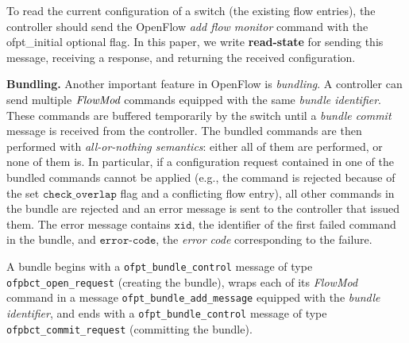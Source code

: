 \documentclass[conference]{sigcomm-alternate}
\newcommand{\FlowMod}{\emph{FlowMod}\xspace}
\newcommand{\checko}{\texttt{check\_overlap}\xspace}
\newcommand{\stefan}[1]{\textit{\textcolor{red}{[stefan]: #1}}} %
\newcommand{\xid}{\texttt{xid}}
\newcommand{\ecode}{\texttt{error-code}}
\begin{document}
To read the current configuration of a switch (the existing flow entries), the controller should send
the OpenFlow \emph{add flow monitor} command with the \textsf{ofpt\_initial} optional flag.
In this paper, we write \textbf{read-state} for sending
this message, receiving a response, and returning the received configuration.

\vspace{1mm}
\noindent\textbf{Bundling.}
%
Another important feature in OpenFlow is \emph{bundling}. %
A controller can send multiple $\FlowMod$ commands  equipped with
the same \emph{bundle identifier}.
These commands are buffered temporarily by
the switch until a \emph{bundle commit} message is received from the
controller.
The bundled commands are then performed with \emph{all-or-nothing semantics}:
either all of them are performed, or none of them is.
In particular, if a configuration request contained in one of the bundled commands cannot
be applied (e.g., the command is rejected because of the set
$\checko$ flag and a conflicting flow entry), all  other commands in
the bundle are rejected and an error
message is sent to the controller that issued them.
The error message contains $\xid$, the identifier of the first failed command in the
bundle, and $\ecode$, the \emph{error code} corresponding to the failure.

A bundle begins with a  \texttt{ofpt\_bundle\_control} message of type
\texttt{ofpbct\_open\_request} (creating the bundle), wraps
each of its \emph{FlowMod} command in a message
\texttt{ofpt\_bundle\_add\_message} equipped with the \emph{bundle
  identifier}, and ends with a \texttt{ofpt\_bundle\_control} message of
type \texttt{ofpbct\_commit\_request} (committing the bundle).



\end{document}
